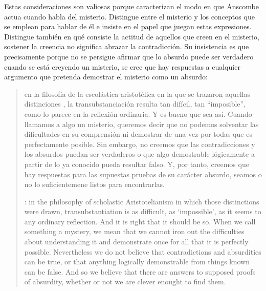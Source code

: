 Estas consideraciones son valiosas porque caracterizan el modo en que Anscombe actua cuando habla del misterio. Distingue entre el misterio y los conceptos que se emplean para hablar de él e insiste en el papel que juegan estas expresiones. Distingue también en qué consiste la actitud de aquellos que creen en el misterio, sostener la creencia no significa abrazar la contradicción. Su insistencia es que precisamente porque no se persigue afirmar que lo absurdo puede ser verdadero cuando se está creyendo un misterio, se cree que hay respuestas a cualquier argumento que pretenda demostrar el misterio como un absurdo: \blockquote[{\cite[109]{anscombe1981erp:ot}}: in the philosophy of scholastic Aristotelianism in which those distinctions  were drawn, transubstantiation is as difficult, as `impossible', as it seems to any ordinary reflection. And it is right that it should be so. When we call something a mystery, we mean that we cannot iron out the difficulties about understanding it and demonstrate once for all that it is perfectly possible. Nevertheless we do not believe that contradictions and absurdities can be true, or that anything logically demonstrable from things known can be false. And so we believe that there are answers to supposed proofs of absurdity, whether or not we are clever enought to find them.]{en la filosofía de la escolástica aristotélica en la que se trazaron aquellas distinciones , la transubstanciación resulta tan difícil, tan ``imposible'', como lo parece en la reflexión ordinaria. Y es bueno que sea así. Cuando llamamos a algo un misterio, queremos decir que no podemos solventar las dificultades en su comprensión ni demostrar de una vez por todas que es perfectamente posible. Sin embargo, no creemos que las contradicciones y los absurdos puedan ser verdaderos o que algo demostrable lógicamente a partir de lo ya conocido pueda resultar falso. Y, por tanto, creemos que hay respuestas para las supuestas pruebas de su carácter absurdo, seamos o no lo suficientemene listos para encontrarlas.}
